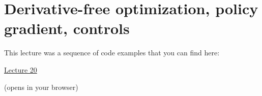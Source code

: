 \section{Derivative-free optimization, policy gradient, controls}

This lecture was a sequence of code examples that you can find here:

\begin{center}
{\Large
\href{https://ee227c.github.io/code/lecture20.html}{Lecture 20}
}

(opens in your browser)
\end{center}



